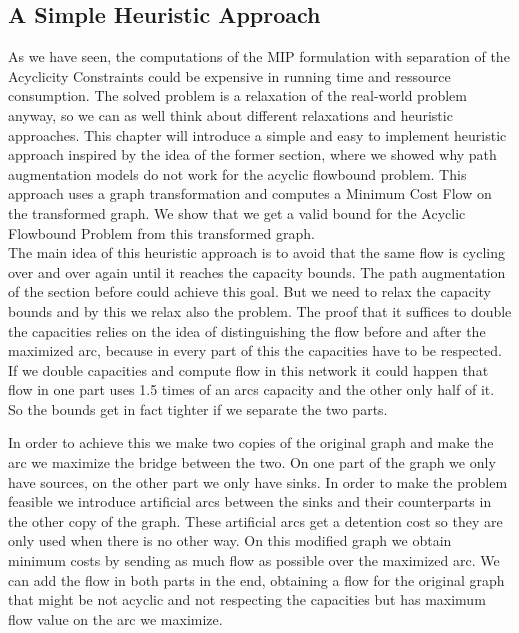 \newpage
\subsection{A Simple Heuristic Approach}

As we have seen, the computations of the MIP formulation with separation of the Acyclicity Constraints could be 
expensive in running time and ressource consumption. The solved problem is a relaxation of the real-world 
problem anyway, so we can as well think 
about different relaxations and heuristic approaches. This chapter will introduce a simple and easy to 
implement heuristic approach inspired by the idea of the former section, where we showed why path augmentation models 
do not work for the acyclic flowbound problem. This approach uses a graph transformation and computes a Minimum Cost 
Flow on the transformed graph. We show that we get a valid bound for the Acyclic Flowbound Problem from this 
transformed graph.\\

The main idea of this heuristic approach is to avoid that the same flow is cycling over and over again until it reaches 
the capacity bounds. The path augmentation of the section before could achieve this goal. But we need to relax the 
capacity bounds and by this we relax also the problem. The proof that it suffices to double the capacities relies on 
the idea of distinguishing the flow before and after the maximized arc, because in every part of this the capacities 
have to be respected. If we double capacities and compute flow in this network it could happen that flow in one part 
uses 1.5 times of an arcs capacity and the other only half of it. So the bounds get in fact tighter if we separate the 
two parts.

In order to achieve this we make two copies of the original graph and make the arc we maximize the 
bridge between the two. On one part of the graph we only have sources, on the other part we only have sinks. 
In order to make the problem feasible we introduce artificial arcs between the sinks and their counterparts in the other 
copy of the graph. These artificial arcs get a detention cost so they are only used when there is no other way. On this 
modified graph we obtain minimum costs by sending as much flow as possible over the maximized arc. We can add the flow 
in both parts in the end, obtaining a flow for the original graph that might be not acyclic and not respecting the 
capacities but has maximum flow value on the arc we maximize. 

